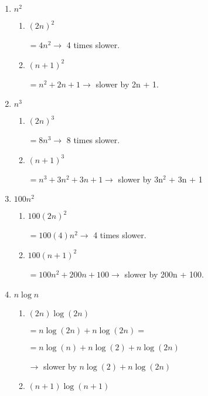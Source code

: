 \documentclass[10pt,reqno,sumlimits]{amsart}
\theoremstyle{plain}
\theoremstyle{definition}
\newcommand{\1}{{\bf 1}}
\numberwithin{equation}{section}
\begin{document}
\begin{enumerate}
\item $n^2$
\begin{enumerate}
\item $(2n)^2$

\hspace{0.3in}$= 4n^2 \rightarrow$ 4 times slower.
\item $(n+1)^2$

\hspace{0.3in}$= n^2 + 2n + 1\rightarrow $ slower by 2n + 1.
\end{enumerate}

\item $n^3$
\begin{enumerate}
\item $(2n)^3$

\hspace{0.3in}$= 8n^3\rightarrow $ 8 times slower.
\item $(n+1)^3$

\hspace{0.3in}$= n^3 + 3n^2 + 3n + 1\rightarrow $ slower by 3n$^2$ + 3n + 1
\end{enumerate}

\item $100n^2$
\begin{enumerate}
\item $100(2n)^2$

\hspace{0.3in}$= 100(4)n^2\rightarrow $ 4 times slower.
\item $100(n+1)^2$

\hspace{0.3in}$= 100n^2 + 200n + 100\rightarrow $ slower by 200n + 100.
\end{enumerate}

\item $n\log n$
\begin{enumerate}
\item $(2n)\log(2n)$

\hspace{0.3in}$= n\log(2n) + n\log(2n) =$

\hspace{0.4in}$= n\log(n) + n\log(2) + n\log(2n)$

\hspace{0.4in}$\rightarrow$ slower by $n\log(2) + n\log(2n)$

\item $(n+1)\log(n+1)$


\end{enumerate}
\end{enumerate}
\end{document}
